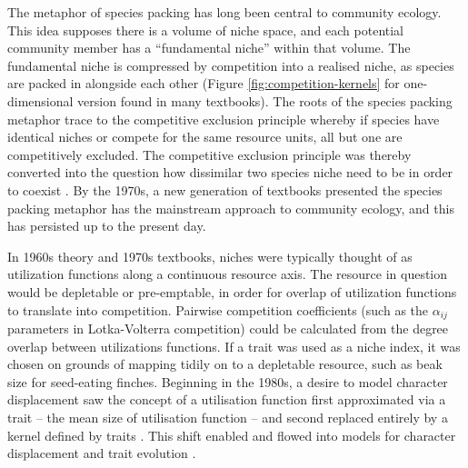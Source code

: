 \documentclass[a4paper,11pt]{article}
\begin{document}

The metaphor of species packing has long been central to community
ecology.  This idea supposes there is a volume of niche space, and
each potential community member has a ``fundamental niche'' within
that volume.  The fundamental niche is compressed by competition into
a realised niche, as species are packed in alongside each other
(Figure \ref{fig:competition-kernels} for one-dimensional version
found in many textbooks).
%
The roots of the species packing metaphor trace to the competitive
exclusion principle \citep{Lotka-1925, Volterra-1926, Gause-1934}
whereby if species have identical niches or compete for the same resource
units, all but one are competitively excluded.
The competitive exclusion principle was thereby converted into the
question how dissimilar two species niche need to be in order to coexist
\citep{MacArthur-1967, Slatkin-1980}.
%
By the 1970s, a new generation of textbooks \citep{Whittaker-1970,Krebs-1972,Ricklefs-1973,Pianka-1974} presented the species packing metaphor has the
mainstream approach to community ecology, and this has persisted up to
the present day.

In 1960s theory and 1970s textbooks, niches were typically thought of
as utilization functions along a continuous resource axis. The
resource in question would be depletable or pre-emptable, in order for
overlap of utilization functions to translate into
competition. Pairwise competition coefficients (such as the
$\alpha_{ij}$ parameters in Lotka-Volterra competition) could be
calculated from the degree overlap between utilizations functions.
If a trait was used as a niche index, it was chosen on grounds of
mapping tidily on to a depletable resource, such as beak size for
seed-eating finches.
Beginning in the 1980s, a desire to model
character displacement saw the concept of a utilisation function first
approximated via a trait -- the mean size of utilisation function
\citep {Roughgarden-1979} -- and second replaced entirely by a kernel
defined by traits \citep{Slatkin-1980,Taper-1985}. This shift enabled
and flowed into models for character displacement
\citep[e.g.,][]{Taper-1985, Case-2000, Goldberg-2006} and trait
evolution \citep{Brown-1987,Geritz-1998,Geritz-1999,Dieckmann-1999,
  Abrams-2001}.
\end{document}
